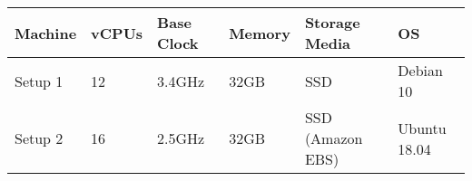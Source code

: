 \begin{tabular}{ |p{1.2cm}|p{1.2cm}|p{2cm}|p{1.6cm}|p{2.7cm}|p{2cm}|}
    \hline
    \rowcolor{Gray}
    Machine   & vCPUs & Base Clock & Memory & Storage Media & OS           \\
    \hline
    Setup 1   & 12    & 3.4GHz     & 32GB   & SSD               & Debian 10    \\
    Setup 2   & 16    & 2.5GHz     & 32GB   & SSD (Amazon EBS)  & Ubuntu 18.04 \\
    \hline
\end{tabular}
